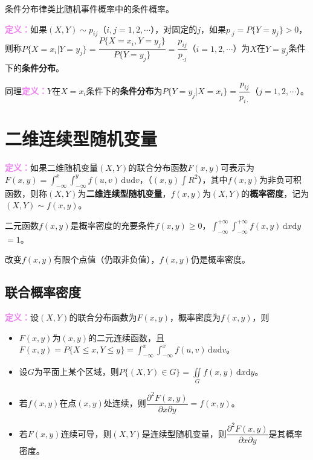 \documentclass[UTF8, 12pt]{ctexart}
\begin{document}
条件分布律类比随机事件概率中的条件概率。

\textcolor{violet}{\textbf{定义：}}如果$(X,Y)\sim p_{ij}$（$i,j=1,2,\cdots$），对固定的$j$，如果$p_{\cdot j}=P\{Y=y_j\}>0$，则称$P\{X=x_i|Y=y_j\}=\dfrac{P\{X=x_i,Y=y_j\}}{P\{Y=y_j\}}=\dfrac{p_{ij}}{p_{\cdot j}}$（$i=1,2,\cdots$）为$X$在$Y=y_j$条件下的\textbf{条件分布}。

同理\textcolor{violet}{\textbf{定义：}}$Y$在$X=x_i$条件下的\textbf{条件分布}为$P\{Y=y_j|X=x_i\}=\dfrac{p_{ij}}{p_{i\cdot}}$（$j=1,2,\cdots$）。

\section{二维连续型随机变量}

\textcolor{violet}{\textbf{定义：}}如果二维随机变量$(X,Y)$的联合分布函数$F(x,y)$可表示为$F(x,y)=\int_{-\infty}^x\int_{-\infty}^yf(u,v)\,\textrm{d}u\textrm{d}v$，（$(x,y)\int R^2$），其中$f(x,y)$为非负可积函数，则称$(X,Y)$为\textbf{二维连续型随机变量}，$f(x,y)$为$(X,Y)$的\textbf{概率密度}，记为$(X,Y)\sim f(x,y)$。

二元函数$f(x,y)$是概率密度的充要条件$f(x,y)\geqslant0$，$\int_{-\infty}^{+\infty}\int_{-\infty}^{+\infty}f(x,y)\,\textrm{d}x\textrm{d}y$\\$=1$。

改变$f(x,y)$有限个点值（仍取非负值），$f(x,y)$仍是概率密度。

\subsection{联合概率密度}

\textcolor{violet}{\textbf{定义：}}设$(X,Y)$的联合分布函数为$F(x,y)$，概率密度为$f(x,y)$，则

\begin{itemize}
    \item $F(x,y)$为$(x,y)$的二元连续函数，且$F(x,y)=P\{X\leqslant x,Y\leqslant y\}=\int_{-\infty}^x\int_{-\infty}^xf(u,v)\,\textrm{d}u\textrm{d}v$。
    \item 设$G$为平面上某个区域，则$P\{(X,Y)\in G\}=\iint\limits_Gf(x,y)\,\textrm{d}x\textrm{d}y$。
    \item 若$f(x,y)$在点$(x,y)$处连续，则$\dfrac{\partial^2F(x,y)}{\partial x\partial y}=f(x,y)$。
    \item 若$F(x,y)$连续可导，则$(X,Y)$是连续型随机变量，则$\dfrac{\partial^2F(x,y)}{\partial x\partial y}$是其概率密度。
\end{itemize}
\end{document}
